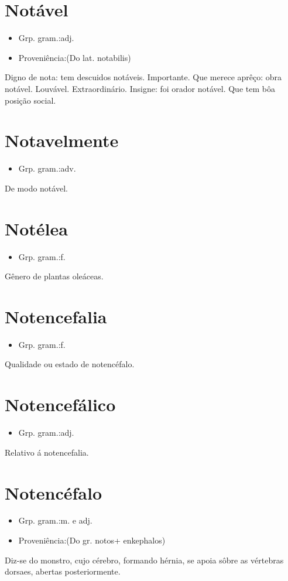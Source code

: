 \section{Notável}
\begin{itemize}
\item {Grp. gram.:adj.}
\end{itemize}
\begin{itemize}
\item {Proveniência:(Do lat. \textunderscore notabilis\textunderscore )}
\end{itemize}
Digno de nota: \textunderscore tem descuidos notáveis\textunderscore .
Importante.
Que merece aprêço: \textunderscore obra notável\textunderscore .
Louvável.
Extraordinário.
Insigne: \textunderscore foi orador notável\textunderscore .
Que tem bôa posição social.
\section{Notavelmente}
\begin{itemize}
\item {Grp. gram.:adv.}
\end{itemize}
De modo notável.
\section{Notélea}
\begin{itemize}
\item {Grp. gram.:f.}
\end{itemize}
Gênero de plantas oleáceas.
\section{Notencefalia}
\begin{itemize}
\item {Grp. gram.:f.}
\end{itemize}
Qualidade ou estado de notencéfalo.
\section{Notencefálico}
\begin{itemize}
\item {Grp. gram.:adj.}
\end{itemize}
Relativo á notencefalia.
\section{Notencéfalo}
\begin{itemize}
\item {Grp. gram.:m.  e  adj.}
\end{itemize}
\begin{itemize}
\item {Proveniência:(Do gr. \textunderscore notos\textunderscore  + \textunderscore enkephalos\textunderscore )}
\end{itemize}
Diz-se do monstro, cujo cérebro, formando hérnia, se apoia sôbre as vértebras dorsaes, abertas posteriormente.
